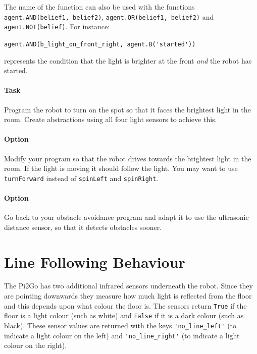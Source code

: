 \documentclass[a4,12pt]{article}
\begin{document}
\medskip

\begin{sloppypar}
\noindent The name of the function can also be used with the functions \lstinline{agent.AND(belief1, belief2)}, \lstinline{agent.OR(belief1, belief2)} and \lstinline{agent.NOT(belief)}.  For instance:
\end{sloppypar}


\medskip

\lstinline{agent.AND(b_light_on_front_right, agent.B('started'))}

\medskip

\noindent represents the condition that the light is brighter at the front \emph{and} the robot has started.

\paragraph{Task} Program the robot to turn on the spot so that it faces the brightest light in the room.  Create abstractions using all four light sensors to achieve this.

\paragraph{Option} Modify your program so that the robot drives towards the brightest light in the room.  If the light is moving it should follow the light.  You may want to use \lstinline{turnForward} instead of \lstinline{spinLeft} and \lstinline{spinRight}.

\paragraph{Option} Go back to your obstacle avoidance program and adapt it to use the ultrasonic distance sensor, so that it detects obstacles sooner.

\section{Line Following Behaviour}

The Pi2Go has two additional infrared sensors underneath the robot.  Since they are pointing downwards they measure how much light is reflected from the floor and this depends upon what colour the floor is.  The sensors return \lstinline{True} if the floor is a light colour (such as white) and \lstinline{False} if it is a dark colour (such as black).  These sensor values are returned with the keys \lstinline{'no_line_left'} (to indicate a light colour on the left) and \lstinline{'no_line_right'} (to indicate a light colour on the right).
\end{document}
